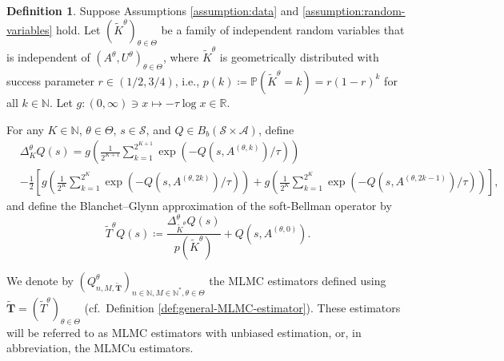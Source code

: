 \documentclass[11pt]{article}
\numberwithin{equation}{section}
\theoremstyle{definition}
\newtheorem{definition}{Definition}[section]
\theoremstyle{remark}
\def\N{{\mathbb{N}}}
\begin{document}
\begin{definition}
    \label{def:T-blanchet-glynn}
    Suppose Assumptions \ref{assumption:data} and \ref{assumption:random-variables} hold. 
    Let $(\tilde{K}^{\theta})_{\theta \in \Theta}$ be  a family of independent random variables 
    that is independent of $(A^\theta, U^\theta)_{\theta\in \Theta}$, where $\tilde{K}^\theta$ is geometrically distributed with success parameter   $r \in (1/2, 3/4)$,
    i.e., $p(k)\coloneqq \mathbb P(\tilde{K}^{\theta} =k)=r(1-r)^k$ for all $k\in \N$. 
    Let  
    $g:  (0,\infty)\ni x \mapsto -\tau \log x \in \mathbb R$. 
    
    
    For any $K \in \N$,
    $\theta \in \Theta$, $s \in \mathcal S$,
    and     $Q \in B_b(\mathcal S \times \mathcal A)$,  define  
    \begin{equation*}
        \label{eq:delta-T-blanchet-glynn}
        \begin{aligned}
             & \Delta_{K}^{\theta}Q(s) =  g \left( \frac{1}{2^{K+1}}\sum_{k = 1}^{2^{K+1}} \exp \left(-Q \left(s,A^{(\theta,k)}\right) / \tau \right) \right)                                                                                                            \\
             & - \frac{1}{2}\left[ g \left( \frac{1}{2^{K}}\sum_{k = 1}^{2^{K}} \exp \left(-Q\left(s,A^{(\theta,2k)}\right) / \tau \right)  \right)  + g \left( \frac{1}{2^{K}}\sum_{k = 1}^{2^{K}} \exp \left(-Q\left(s,A^{(\theta,2k-1)}\right) / \tau \right)  \right) \right],
        \end{aligned}
    \end{equation*}
    and define 
      the Blanchet--Glynn approximation of the soft-Bellman operator by 
    \begin{equation}
        \label{eq:T-blanchet-glynn}
        \tilde{T}^\theta Q (s) \coloneqq  \frac{\Delta_{\tilde{K}^{\theta}}^\theta Q (s)}{p(\tilde{K}^\theta)} +  Q(s,A^{(\theta,0)}).
    \end{equation}


 
We denote by $({Q}_{n,M, \tilde{\mathbf{T}}}^{\theta})_{n\in \N, M\in \N^*,\theta\in \Theta}$  the MLMC estimators  defined using $\tilde{\mathbf{T}} =(\tilde{T}^{\theta})_{\theta\in \Theta}  $ 
    (cf.~Definition \ref{def:general-MLMC-estimator}).
    These estimators will be referred to as     MLMC estimators with unbiased estimation, or, in abbreviation, the MLMCu estimators.  
\end{definition}
\end{document}

